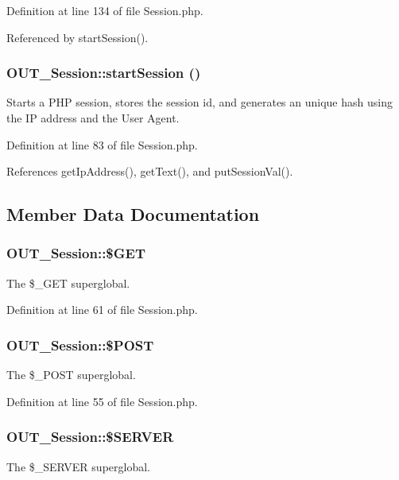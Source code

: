 Definition at line 134 of file Session.php.

Referenced by startSession().\hypertarget{classOUT__Session_ae753f4f970b7ef5701ca06eb8319755e}{
\subsubsection[{startSession}]{\setlength{\rightskip}{0pt plus 5cm}OUT\_\-Session::startSession ()}}
\label{d6/d75/classOUT__Session_ae753f4f970b7ef5701ca06eb8319755e}
Starts a PHP session, stores the session id, and generates an unique hash using the IP address and the User Agent. 

Definition at line 83 of file Session.php.

References getIpAddress(), getText(), and putSessionVal().

\subsection{Member Data Documentation}
\hypertarget{classOUT__Session_a34c08d712763261ab4a2efe76db27919}{
\subsubsection[{\$GET}]{\setlength{\rightskip}{0pt plus 5cm}OUT\_\-Session::\$GET}}
\label{d6/d75/classOUT__Session_a34c08d712763261ab4a2efe76db27919}
The \$\_\-GET superglobal. 

Definition at line 61 of file Session.php.\hypertarget{classOUT__Session_abb034dc0d8a6fd5242974685313742cc}{
\subsubsection[{\$POST}]{\setlength{\rightskip}{0pt plus 5cm}OUT\_\-Session::\$POST}}
\label{d6/d75/classOUT__Session_abb034dc0d8a6fd5242974685313742cc}
The \$\_\-POST superglobal. 

Definition at line 55 of file Session.php.\hypertarget{classOUT__Session_a257c5b20188e45a080a024ecba899883}{
\subsubsection[{\$SERVER}]{\setlength{\rightskip}{0pt plus 5cm}OUT\_\-Session::\$SERVER}}
\label{d6/d75/classOUT__Session_a257c5b20188e45a080a024ecba899883}
The \$\_\-SERVER superglobal. 

